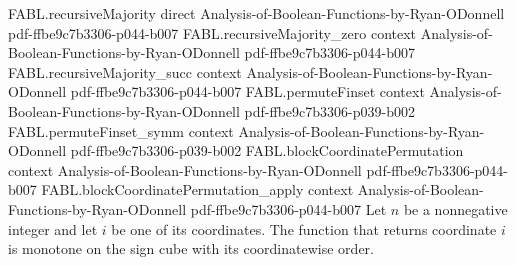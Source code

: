 \begin{theorem}
  {FABL.recursiveMajority}
  {direct}
  {Analysis-of-Boolean-Functions-by-Ryan-ODonnell}
  {pdf-ffbe9c7b3306-p044-b007}
\proofstep
  {FABL.recursiveMajority_zero}
  {context}
  {Analysis-of-Boolean-Functions-by-Ryan-ODonnell}
  {pdf-ffbe9c7b3306-p044-b007}
\proofstep
  {FABL.recursiveMajority_succ}
  {context}
  {Analysis-of-Boolean-Functions-by-Ryan-ODonnell}
  {pdf-ffbe9c7b3306-p044-b007}
\proofstep
  {FABL.permuteFinset}
  {context}
  {Analysis-of-Boolean-Functions-by-Ryan-ODonnell}
  {pdf-ffbe9c7b3306-p039-b002}
\proofstep
  {FABL.permuteFinset_symm}
  {context}
  {Analysis-of-Boolean-Functions-by-Ryan-ODonnell}
  {pdf-ffbe9c7b3306-p039-b002}
\proofstep
  {FABL.blockCoordinatePermutation}
  {context}
  {Analysis-of-Boolean-Functions-by-Ryan-ODonnell}
  {pdf-ffbe9c7b3306-p044-b007}
\proofstep
  {FABL.blockCoordinatePermutation_apply}
  {context}
  {Analysis-of-Boolean-Functions-by-Ryan-ODonnell}
  {pdf-ffbe9c7b3306-p044-b007}
Let $n$ be a nonnegative integer and let $i$ be one of its coordinates. The function
that returns coordinate $i$ is monotone on the sign cube with its coordinatewise order.
\end{theorem}

